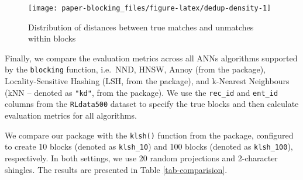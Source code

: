 \begin{figure}[ht!]

{\centering \texttt{[image: paper-blocking\_files/figure-latex/dedup-density-1]} 

}

\caption{Distribution of distances between true matches and unmatches within blocks}\label{fig:dedup-density}
\end{figure}

Finally, we compare the evaluation metrics across all ANNs algorithms
supported by the \texttt{blocking} function, i.e.~NND, HNSW, Annoy (from the  package),
Locality-Sensitive Hashing (LSH, from the  package), and
k-Nearest Neighbours (kNN -- denoted as \texttt{"kd"}, from the 
package). We use the \texttt{rec\_id} and \texttt{ent\_id} columns from the \texttt{RLdata500}
dataset to specify the true blocks and then calculate evaluation metrics
for all algorithms.

We compare our package with the \texttt{klsh()}
function from the  package, configured to create 10 blocks (denoted as \texttt{klsh\_10})
and 100 blocks (denoted as \texttt{klsh\_100}), respectively. In both settings, we use 20 random
projections and 2-character shingles. The results are presented in Table \ref{tab-comparision}.

